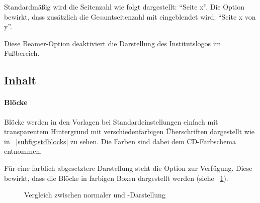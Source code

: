 \begin{Declaration}
\end{Declaration}

Standardmäßig wird die Seitenzahl wie folgt dargestellt: "`Seite x"'.
Die Option  bewirkt, dass zusätzlich die Gesamtseitenzahl
mit eingeblendet wird: "`Seite x von y"'.

\begin{Declaration}
\end{Declaration}

Diese Beamer-Option deaktiviert die Darstellung des Institutslogos im Fußbereich.

\subsection{Inhalt}

\paragraph{Blöcke}

Blöcke werden in den Vorlagen bei Standardeinstellungen einfach
mit transparentem Hintergrund mit verschiedenfarbigen Überschriften dargestellt
wie in \figurename~\ref{subfig:stdblocks} zu sehen.
Die Farben sind dabei dem CD-Farbschema entnommen.

\begin{Declaration}
\end{Declaration}

Für eine farblich abgesetztere Darstellung steht die Option 
zur Verfügung. Diese bewirkt, dass die Blöcke in farbigen Boxen dargestellt werden
(siehe \figurename~\ref{subfig:colorblocks}).


\begin{figure}[!ht]
\begin{minipage}{0.5\textwidth}
  \centering
  \label{subfig:stdblocks}
\end{minipage}
\begin{minipage}{0.5\textwidth}
  \centering
  \label{subfig:colorblocks}
\end{minipage}
\caption{Vergleich zwischen normaler und -Darstellung}
\end{figure}


